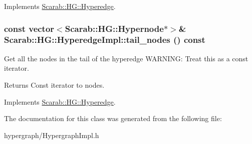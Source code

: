 Implements \hyperlink{class_scarab_1_1_h_g_1_1_hyperedge_a9ec8cf9ea7b5f762f359a6f9f1c038da}{Scarab::HG::Hyperedge}.

\hypertarget{class_scarab_1_1_h_g_1_1_hyperedge_impl_a3bf00c8c032397150f59e196aea5e245}{
\subsubsection[{tail\_\-nodes}]{\setlength{\rightskip}{0pt plus 5cm}const vector$<${\bf Scarab::HG::Hypernode}$\ast$$>$\& Scarab::HG::HyperedgeImpl::tail\_\-nodes () const}}
\label{class_scarab_1_1_h_g_1_1_hyperedge_impl_a3bf00c8c032397150f59e196aea5e245}
Get all the nodes in the tail of the hyperedge WARNING: Treat this as a const iterator. \begin{DoxyReturn}{Returns}
Const iterator to nodes. 
\end{DoxyReturn}


Implements \hyperlink{class_scarab_1_1_h_g_1_1_hyperedge_abac6d27691186608aa12949de6e1c283}{Scarab::HG::Hyperedge}.



The documentation for this class was generated from the following file:\begin{DoxyCompactItemize}
\item 
hypergraph/HypergraphImpl.h\end{DoxyCompactItemize}
